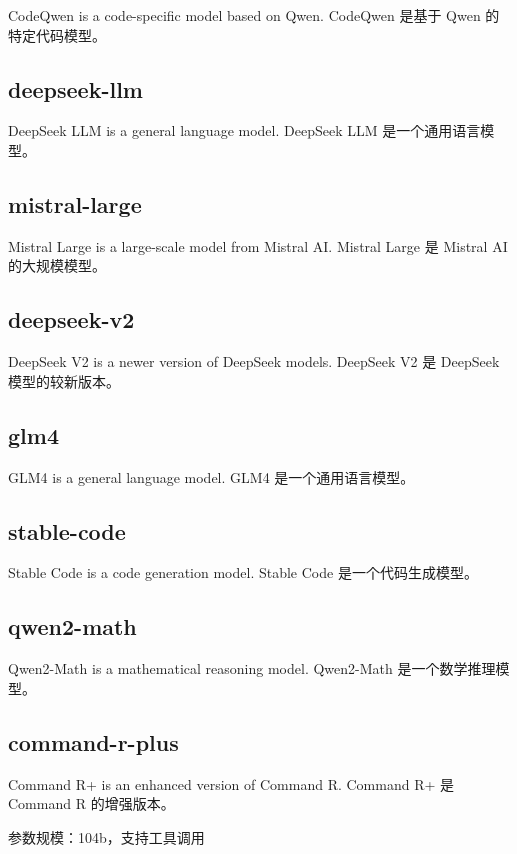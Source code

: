 \documentclass[12pt,UTF8]{ctexbook}
\begin{document}
CodeQwen is a code-specific model based on Qwen.
CodeQwen 是基于 Qwen 的特定代码模型。

\subsection{deepseek-llm}

DeepSeek LLM is a general language model.
DeepSeek LLM 是一个通用语言模型。

\subsection{mistral-large}

Mistral Large is a large-scale model from Mistral AI.
Mistral Large 是 Mistral AI 的大规模模型。

\subsection{deepseek-v2}

DeepSeek V2 is a newer version of DeepSeek models.
DeepSeek V2 是 DeepSeek 模型的较新版本。

\subsection{glm4}

GLM4 is a general language model.
GLM4 是一个通用语言模型。

\subsection{stable-code}

Stable Code is a code generation model.
Stable Code 是一个代码生成模型。

\subsection{qwen2-math}

Qwen2-Math is a mathematical reasoning model.
Qwen2-Math 是一个数学推理模型。

\subsection{command-r-plus}

Command R+ is an enhanced version of Command R.
Command R+ 是 Command R 的增强版本。

参数规模：104b，支持工具调用
\end{document}
